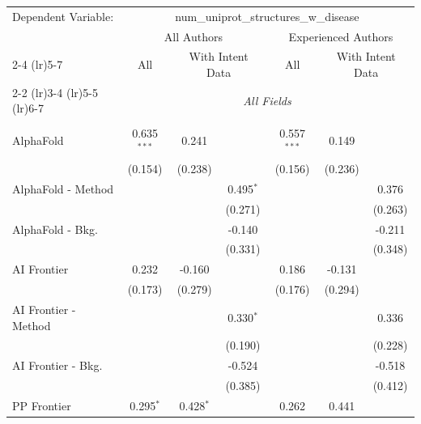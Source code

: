 \begingroup
\centering
\begin{tabular}{lcccccc}
   \tabularnewline \midrule \midrule
   Dependent Variable: & \multicolumn{6}{c}{num\_uniprot\_structures\_w\_disease}\\
 & \multicolumn{3}{c}{All Authors} & \multicolumn{3}{c}{Experienced Authors} \\
\cmidrule(lr){2-4} \cmidrule(lr){5-7}
 & \multicolumn{1}{c}{All} & \multicolumn{2}{c}{With Intent Data} & \multicolumn{1}{c}{All} & \multicolumn{2}{c}{With Intent Data} \\
\cmidrule(lr){2-2} \cmidrule(lr){3-4} \cmidrule(lr){5-5} \cmidrule(lr){6-7}
 & \multicolumn{6}{c}{\textit{All Fields}} \\ \\
   AlphaFold            & 0.635$^{***}$ & 0.241       &               & 0.557$^{***}$ & 0.149   &   \\   
                        & (0.154)       & (0.238)     &               & (0.156)       & (0.236) &   \\   
   AlphaFold - Method   &               &             & 0.495$^{*}$   &               &         & 0.376\\   
                        &               &             & (0.271)       &               &         & (0.263)\\   
   AlphaFold - Bkg.     &               &             & -0.140        &               &         & -0.211\\   
                        &               &             & (0.331)       &               &         & (0.348)\\   
   AI Frontier          & 0.232         & -0.160      &               & 0.186         & -0.131  &   \\   
                        & (0.173)       & (0.279)     &               & (0.176)       & (0.294) &   \\   
   AI Frontier - Method &               &             & 0.330$^{*}$   &               &         & 0.336\\   
                        &               &             & (0.190)       &               &         & (0.228)\\   
   AI Frontier - Bkg.   &               &             & -0.524        &               &         & -0.518\\   
                        &               &             & (0.385)       &               &         & (0.412)\\   
   PP Frontier          & 0.295$^{*}$   & 0.428$^{*}$ &               & 0.262         & 0.441   &   \\   

\end{tabular}
